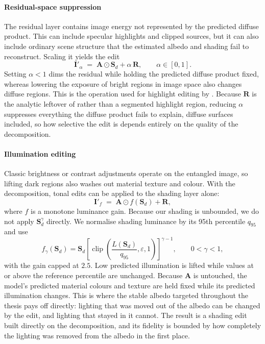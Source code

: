 \paragraph{Residual-space suppression}

The residual layer contains image energy not represented by the predicted diffuse
product. This can include specular highlights and clipped sources, but it can also
include ordinary scene structure that the estimated albedo and shading fail to
reconstruct.
Scaling it yields the edit
\begin{equation}
  \mathbf{I}'_{\alpha}
  \;=\;
  \mathbf{A} \odot \mathbf{S}_d + \alpha\,\mathbf{R},
  \qquad \alpha \in [0, 1] .
  \label{eq:glare}
\end{equation}
Setting $\alpha < 1$ dims the residual while holding the predicted diffuse product fixed,
whereas lowering the exposure of bright regions in image space also changes diffuse regions.
This is the operation used for highlight editing by . Because
$\mathbf{R}$ is the analytic leftover of  rather than a segmented
highlight region, reducing $\alpha$ suppresses everything the diffuse product fails to
explain, diffuse surfaces included, so how selective the edit is depends entirely on the
quality of the decomposition.

\paragraph{Illumination editing}

Classic brightness or contrast adjustments operate on the entangled image, so
lifting dark regions also washes out material texture and colour.
With the decomposition, tonal edits can be applied to the shading layer alone:
\begin{equation}
  \mathbf{I}'_{f}
  \;=\;
  \mathbf{A} \odot f(\mathbf{S}_d) + \mathbf{R},
  \label{eq:illum_edit}
\end{equation}
where $f$ is a monotone luminance gain. Because our shading is unbounded, we do
not apply $\mathbf{S}_d^{\gamma}$ directly. We normalise shading luminance by its
95th percentile $q_{95}$ and use
\begin{equation}
 f_{\gamma}(\mathbf{S}_d)
 = \mathbf{S}_d
 \left[\operatorname{clip}\!\left(
 \frac{L(\mathbf{S}_d)}{q_{95}},\varepsilon,1\right)\right]^{\gamma-1},
 \qquad 0<\gamma<1 ,
 \label{eq:shadow_lift}
\end{equation}
with the gain capped at $2.5$. Low predicted illumination is lifted while values
at or above the reference percentile are unchanged.
Because $\mathbf{A}$ is untouched, the model's predicted material colours and
texture are held fixed while its predicted illumination changes.
This is where the stable albedo targeted throughout the thesis pays off directly: lighting
that was moved out of the albedo can be changed by the edit, and lighting that stayed in it
cannot. The result is a shading edit built directly on the decomposition, and its fidelity
is bounded by how completely the lighting was removed from the albedo in the first place.

